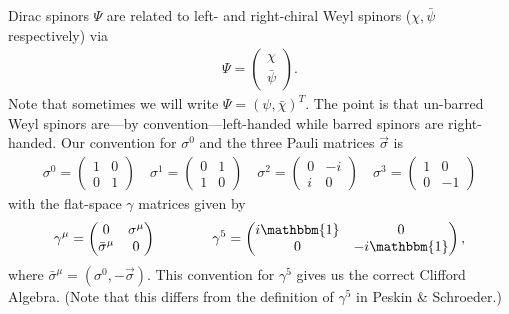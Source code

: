 \documentclass[12pt, oneside]{report}    %
\begin{document}
Dirac spinors $\Psi$ are related to left- and right-chiral Weyl spinors ($\chi, \bar\psi$ respectively) via
\begin{align}
    \Psi = \begin{pmatrix}
        \chi \\
        \bar\psi
    \end{pmatrix}.
\end{align}
Note that sometimes we will write $\Psi=(\psi,\bar\chi)^T$. The point is that un-barred Weyl spinors are---by convention---left-handed while barred spinors are right-handed. 
Our convention for $\sigma^0$ and the three Pauli matrices $\vec\sigma$ is
\begin{align}
    \sigma^0 = 
    \begin{pmatrix}
        1 & 0\\
        0 & 1
    \end{pmatrix}
    \quad
    \sigma^1 = 
    \begin{pmatrix}
        0 & 1\\
        1 & 0
    \end{pmatrix}
    \quad
    \sigma^2 = 
    \begin{pmatrix}
        0 & -i\\
        i & 0
    \end{pmatrix}
    \quad
    \sigma^3 = 
    \begin{pmatrix}
        1 & 0\\
        0 & -1
    \end{pmatrix}
\end{align}
with the flat-space $\gamma$ matrices given by
\begin{align}
    \gamma^\mu =
    \begin{pmatrix}
        0 & \sigma^\mu \\
        \bar\sigma^\mu & 0 
    \end{pmatrix}
    \quad\quad\quad\quad
    \gamma^5=
    \begin{pmatrix}
        i\mathbbm{1} & 0 \\
        0 & -i\mathbbm{1}
    \end{pmatrix},
\end{align}
where $\bar\sigma^\mu = (\sigma^0, -\vec\sigma)$.
This convention for $\gamma^5$ gives us the correct Clifford Algebra. (Note that this differs from the definition of $\gamma^5$ in Peskin \& Schroeder.)




\printindex

% 
\end{document}
